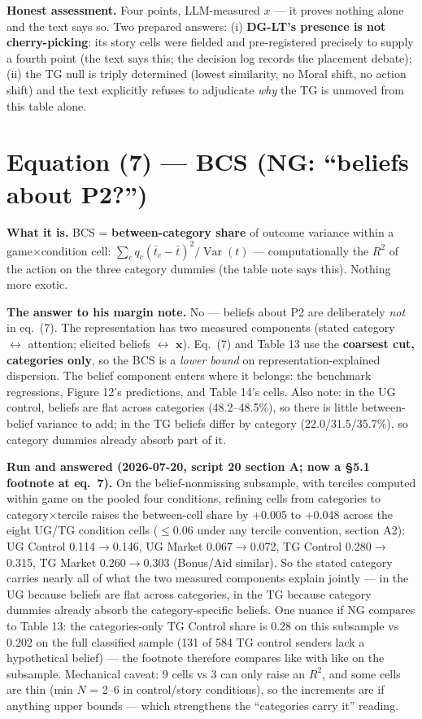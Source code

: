\documentclass[11pt]{article}
\begin{document}
\textbf{Honest assessment.} Four points, LLM-measured $x$ --- it proves nothing alone and the text says so. Two prepared answers: (i) \textbf{DG-LT's presence is not cherry-picking}: its story cells were fielded and pre-registered precisely to supply a fourth point (the text says this; the decision log records the placement debate); (ii) the TG null is triply determined (lowest similarity, no Moral shift, no action shift) and the text explicitly refuses to adjudicate \emph{why} the TG is unmoved from this table alone.

\section{Equation (7) --- BCS (NG: ``beliefs about P2?'')}

\textbf{What it is.} BCS = \textbf{between-category share} of outcome variance within a game$\times$condition cell: $\sum_c q_c (\bar t_c - \bar t)^2 / \operatorname{Var}(t)$ --- computationally the $R^2$ of the action on the three category dummies (the table note says this). Nothing more exotic.

\textbf{The answer to his margin note.} No --- beliefs about P2 are deliberately \emph{not} in eq.~(7). The representation has two measured components (stated category $\leftrightarrow$ attention; elicited beliefs $\leftrightarrow$ $\mathbf{x}$). Eq.~(7) and Table 13 use the \textbf{coarsest cut, categories only}, so the BCS is a \emph{lower bound} on representation-explained dispersion. The belief component enters where it belongs: the benchmark regressions, Figure 12's predictions, and Table 14's cells. Also note: in the UG control, beliefs are flat across categories (48.2--48.5\%), so there is little between-belief variance to add; in the TG beliefs differ by category (22.0/31.5/35.7\%), so category dummies already absorb part of it.

\textbf{Run and answered (2026-07-20, script 20 section A; now a \S5.1 footnote at eq.~7).} On the belief-nonmissing subsample, with terciles computed within game on the pooled four conditions, refining cells from categories to category$\times$tercile raises the between-cell share by +0.005 to +0.048 across the eight UG/TG condition cells ($\le$0.06 under any tercile convention, section A2): UG Control 0.114$\to$0.146, UG Market 0.067$\to$0.072, TG Control 0.280$\to$0.315, TG Market 0.260$\to$0.303 (Bonus/Aid similar). So the stated category carries nearly all of what the two measured components explain jointly --- in the UG because beliefs are flat across categories, in the TG because category dummies already absorb the category-specific beliefs. One nuance if NG compares to Table 13: the categories-only TG Control share is 0.28 on this subsample vs 0.202 on the full classified sample (131 of 584 TG control senders lack a hypothetical belief) --- the footnote therefore compares like with like on the subsample. Mechanical caveat: 9 cells vs 3 can only raise an $R^2$, and some cells are thin (min $N$ = 2--6 in control/story conditions), so the increments are if anything upper bounds --- which strengthens the ``categories carry it'' reading.
\end{document}
